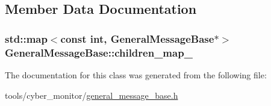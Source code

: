 \subsection{Member Data Documentation}
\hypertarget{classGeneralMessageBase_a5ff98bf477e95204ca2021be372d3eba}{
\subsubsection[{children\-\_\-map\-\_\-}]{\setlength{\rightskip}{0pt plus 5cm}std\-::map$<$const int, {\bf General\-Message\-Base}$\ast$$>$ General\-Message\-Base\-::children\-\_\-map\-\_\-\hspace{0.3cm}{\ttfamily [protected]}}}\label{classGeneralMessageBase_a5ff98bf477e95204ca2021be372d3eba}


The documentation for this class was generated from the following file\-:\begin{DoxyCompactItemize}
\item 
tools/cyber\-\_\-monitor/\hyperlink{general__message__base_8h}{general\-\_\-message\-\_\-base.\-h}\end{DoxyCompactItemize}
